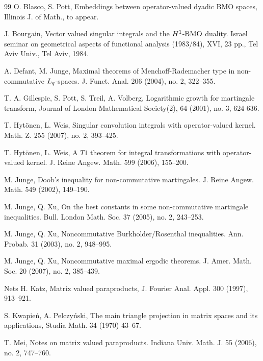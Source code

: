 \begin{thebibliography}{99}
  O. Blasco, S. Pott, Embeddings between operator-valued dyadic BMO
spaces, Illinois J. of Math., to appear.

 J. Bourgain, Vector valued singular integrals and the $H\sp 1$-${\rm BMO}$ duality.
Israel seminar on geometrical aspects of functional analysis (1983/84),  XVI, 23 pp., Tel Aviv Univ.,
Tel Aviv, 1984.

 A. Defant, M. Junge,
Maximal theorems of Menchoff-Rademacher type in non-commutative $L\sb q$-spaces.  J. Funct. Anal.  206  (2004),  no. 2, 322--355.

\bibitem{[GPTV]}  T. A. Gillespie, S. Pott, S. Treil, A. Volberg,
Logarithmic growth for martingale transform, Journal of London Mathematical
Society(2), 64 (2001), no. 3, 624-636.


 T. Hyt\"onen, L. Weis, Singular convolution integrals with operator-valued kernel.  Math. Z.  255  (2007),  no. 2, 393--425.

 T. Hyt\"onen, L. Weis, A $T1$ theorem for integral transformations with operator-valued kernel. J. Reine Angew. Math. 599 (2006), 155--200.

 M. Junge,
Doob's inequality for non-commutative martingales.  J. Reine Angew. Math.  549  (2002), 149--190.

  M. Junge, Q. Xu, On the best constants in some
non-commutative martingale inequalities. Bull. London Math. Soc. 37 (2005),
no. 2, 243--253.

 M. Junge, Q. Xu,
Noncommutative Burkholder/Rosenthal inequalities.  Ann. Probab.  31  (2003),  no. 2, 948--995.

 M. Junge, Q. Xu,
Noncommutative maximal ergodic theorems.  J. Amer. Math. Soc.  20  (2007),  no. 2, 385--439.

  Nets H. Katz, Matrix valued paraproducts, J. Fourier Anal.
Appl. 300 (1997), 913--921.

  S. Kwapie\'{n}, A. Pelczy\'{n}ski, The main triangle
projection in matrix spaces and its applications, Studia Math. 34 (1970)
43--67.

  T. Mei, Notes on matrix valued paraproducts. Indiana Univ.
Math. J. 55 (2006), no. 2, 747--760.


\end{thebibliography}
